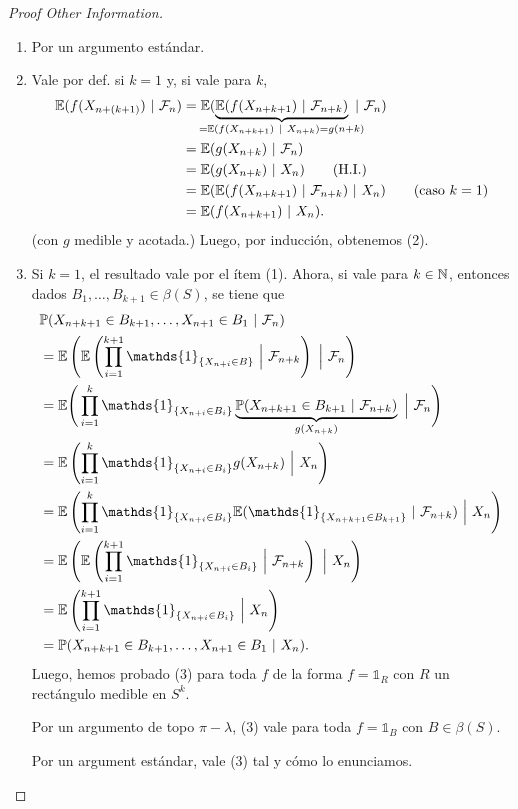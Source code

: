 \begin{proof}[Proof Other Information]
	\begin{enumerate}
		\item Por un argumento estándar.

		\item Vale por def. si $k = 1$ y, si vale para $k$,
		\begin{align*}
			\mbb{E}(f(X_{n + (k + 1)}) \ | \ \mcal{F}_{n}) &= \mbb{E}(\underbrace{\mbb{E}(f(X_{n+k+1}) \ | \ \mcal{F}_{n+k})}_{\mathclap{= \mbb{E}(f(X_{n+k+1}) \ | \ X_{n+k}) = g(n+k)}} \ | \ \mcal{F}_{n}) \\
			&= \mbb{E}(g(X_{n+k}) \ | \ \mcal{F}_{n}) \\
			&= \mbb{E}(g(X_{n+k}) \ | \ X_{n}) \tag{H.I.} \\
			&= \mbb{E}(\mbb{E}(f(X_{n+k+1}) \ | \ \mcal{F}_{n+k}) \ | \ X_{n}) \tag{caso $k=1$} \\
			&= \mbb{E}(f(X_{n+k+1}) \ | \ X_{n})
		.\end{align*}
		(con $g$ medible y acotada.) Luego, por inducción, obtenemos (2).

		\item Si $k=1$, el resultado vale por el ítem (1). Ahora, si vale para $k \in \mathbb{N}$, entonces dados $B_{1},\dots,B_{k+1} \in \beta(S)$, se tiene que
		\begin{align*}
			& \mbb{P}(X_{n+k+1} \in B_{k+1}, \dots, X_{n+1} \in B_{1} \ | \ \mcal{F}_{n}) \\
			&= \mbb{E}\left( \mbb{E}\left( \prod_{i=1}^{k+1} \mathds{1}_{\{X_{n+i} \in B\}} \ \Big| \ \mcal{F}_{n+k} \right) \ \Big| \ \mcal{F}_{n} \right) \\
			&= \mbb{E}\Bigg( \prod_{i=1}^{k} \mathds{1}_{\{X_{n+i} \in B_{i}\}} \underbrace{\mbb{P}(X_{n+k+1} \in B_{k+1} \ | \ \mcal{F}_{n+k})}_{g(X_{n+k})} \ \Big| \ \mcal{F}_{n} \Bigg) \\
			&= \mbb{E}\left( \prod_{i=1}^{k} \mathds{1}_{\{X_{n+i} \in B_{i}\}} g(X_{n+k}) \ \Big| \ X_{n} \right) \\
			&= \mbb{E}\left( \prod_{i=1}^{k} \mathds{1}_{\{X_{n+i} \in B_{i}\}} \mbb{E}(\mathds{1}_{\{X_{n+k+1} \in B_{k+1}\}} \ | \ \mcal{F}_{n+k}) \ \Big| \ X_{n} \right) \\
			&= \mbb{E}\left( \mbb{E}\left( \prod_{i=1}^{k+1} \mathds{1}_{\{X_{n+i} \in B_{i}\}} \ \Big| \ \mcal{F}_{n+k} \right) \ \Big| \ X_{n} \right) \\
			&= \mbb{E}\left( \prod_{i=1}^{k+1} \mathds{1}_{\{X_{n+i} \in B_{i}\}} \ \Big| \ X_{n} \right) \\
			&= \mbb{P}(X_{n+k+1} \in B_{k+1}, \dots, X_{n+1} \in B_{1} \ | \ X_{n})
		.\end{align*}
		Luego, hemos probado (3) para toda $f$ de la forma $f = \mathds{1}_{R}$ con $R$ un rectángulo medible en $S^{k}$. \par
		Por un argumento de topo $\pi - \lambda$, (3) vale para toda $f = \mathds{1}_{B}$ con $B \in \beta(S)$. \par
		Por un argument estándar, vale (3) tal y cómo lo enunciamos.


\end{enumerate}
\end{proof}
